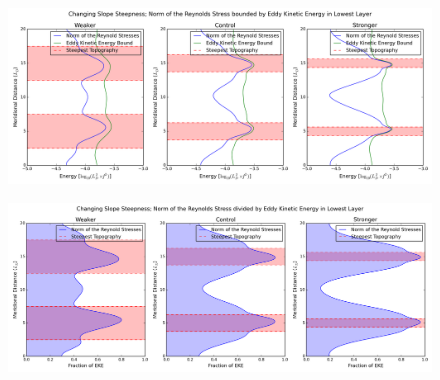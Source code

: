 \documentclass[12pt,a4paper]{report}
\begin{document}
\begin{figure}
	\centering
	\includegraphics[width=\linewidth]{ekebound_2_1}
	\caption{ }
	\label{fig:ekeboundwidth}
\end{figure}

\begin{figure}
	\centering
	\includegraphics[width=\linewidth]{normovereke_2_1}
	\caption{ }
	\label{fig:normoverekewidth}
\end{figure}
\end{document}
